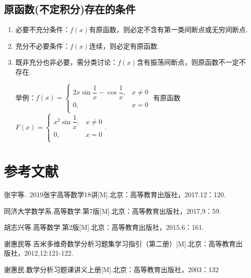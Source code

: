   \subsection{原函数(不定积分)存在的条件}
    \begin{enumerate}[label=(\arabic*)]
      \item 必要不充分条件：$f(x)$有原函数，则必定不含有第一类间断点或无穷间断点.
      \item 充分不必要条件：$f(x)$连续，则必定有原函数.
      \item 既非充分也非必要，需分类讨论：$f(x)$含有振荡间断点，则原函数不一定不存在.

      举例：$f\left( x \right) =\begin{cases}
        2x\sin \dfrac{1}{x}-\cos \dfrac{1}{x},&   x\ne 0\\
        0, &    x=0\\
      \end{cases}$
      有原函数
      $F\left( x \right) =\begin{cases}
        x^2\sin \dfrac{1}{x},&   x\ne 0\\
        0, &    x=0\\
      \end{cases}$.
    \end{enumerate}

\section{参考文献}
\begin{enumerate}[label={[\arabic*]}]
  \item 张宇等.~2019张宇高等数学18讲[M].北京：高等教育出版社，2017.12：120.
  \item 同济大学数学系.高等数学.第7版[M].北京：高等教育出版社，2017,9：59.
  \item 胡志兴等.高等数学.第2版[M].北京：高等教育出版社，2015.6：161.
  \item 谢惠民等.吉米多维奇数学分析习题集学习指引（第二册）[M].北京：高等教育出版社，2012,12:121-122.
  \item 谢惠民.数学分析习题课讲义上册[M].北京：高等教育出版社，2003：132
\end{enumerate}